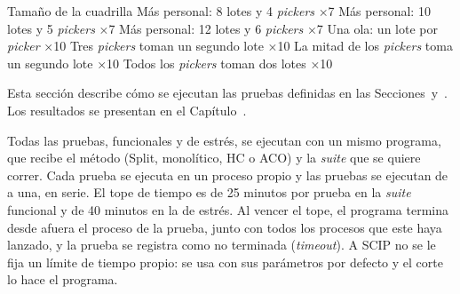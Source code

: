 	\bTR \bTD[nc=7, style=bold, align=flushleft] Tamaño de la cuadrilla \eTD \eTR
	\bTR {} \eTD \bTD Más personal: 8 lotes y 4 {\em pickers} \eTD {} \eTD {} \eTD {} \eTD {}×7 \eTD {} \eTD \eTR
	\bTR {} \eTD \bTD Más personal: 10 lotes y 5 {\em pickers} \eTD {} \eTD {} \eTD {} \eTD {}×7 \eTD {} \eTD \eTR
	\bTR {} \eTD \bTD Más personal: 12 lotes y 6 {\em pickers} \eTD {} \eTD {} \eTD {} \eTD {}×7 \eTD {} \eTD \eTR
	\bTR {} \eTD \bTD Una ola: un lote por {\em picker} \eTD {} \eTD {} \eTD {} \eTD {}×10 \eTD {} \eTD \eTR
	\bTR {} \eTD \bTD Tres {\em pickers} toman un segundo lote \eTD {} \eTD {} \eTD {} \eTD {}×10 \eTD {} \eTD \eTR
	\bTR {} \eTD \bTD La mitad de los {\em pickers} toma un segundo lote \eTD {} \eTD {} \eTD {} \eTD {}×10 \eTD {} \eTD \eTR
	\bTR {} \eTD \bTD Todos los {\em pickers} toman dos lotes \eTD {} \eTD {} \eTD {} \eTD {}×10 \eTD {} \eTD \eTR
	\eTABLE
\stopplacetable

\stopsubsection

\stopsection

\startsection[title={Ejecución de las pruebas}, reference=sec:ejecucion]

Esta sección describe cómo se ejecutan las pruebas definidas en las
Secciones~ y~. Los
resultados se presentan en el Capítulo~\in[Capitulo_6].

Todas las pruebas, funcionales y de estrés, se ejecutan con un mismo
programa, que recibe el método (Split, monolítico, HC o ACO) y la {\em suite} que
se quiere correr. Cada prueba
se ejecuta en un proceso propio y las pruebas se ejecutan de a una, en serie.
El tope de tiempo es de 25 minutos por prueba en la {\em suite} funcional y de 40
minutos en la de estrés. Al vencer el tope, el programa termina desde afuera
el proceso de la prueba, junto con todos los procesos que este haya lanzado,
y la prueba se registra como no terminada ({\em timeout}). A SCIP no se le
fija un límite de tiempo propio: se usa con sus parámetros por defecto y el
corte lo hace el programa.


